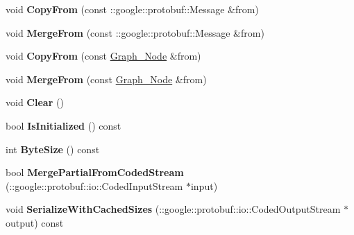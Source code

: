\begin{DoxyCompactItemize}
\item 
\hypertarget{classgraph_1_1Graph__Node_a5f3eca853b1a6ab6d72b95fc63edc476}{
void {\bfseries CopyFrom} (const ::google::protobuf::Message \&from)}
\label{classgraph_1_1Graph__Node_a5f3eca853b1a6ab6d72b95fc63edc476}

\item 
\hypertarget{classgraph_1_1Graph__Node_a4c182ee38bc9ad649a9ae67f9ba5ae18}{
void {\bfseries MergeFrom} (const ::google::protobuf::Message \&from)}
\label{classgraph_1_1Graph__Node_a4c182ee38bc9ad649a9ae67f9ba5ae18}

\item 
\hypertarget{classgraph_1_1Graph__Node_ab2ba680d4220f5c206b77aa8dafd5816}{
void {\bfseries CopyFrom} (const \hyperlink{classgraph_1_1Graph__Node}{Graph\_\-Node} \&from)}
\label{classgraph_1_1Graph__Node_ab2ba680d4220f5c206b77aa8dafd5816}

\item 
\hypertarget{classgraph_1_1Graph__Node_a979ddc18e4e1238cf396311c6622ef43}{
void {\bfseries MergeFrom} (const \hyperlink{classgraph_1_1Graph__Node}{Graph\_\-Node} \&from)}
\label{classgraph_1_1Graph__Node_a979ddc18e4e1238cf396311c6622ef43}

\item 
\hypertarget{classgraph_1_1Graph__Node_a4bddb506c7141091ad3989769a535604}{
void {\bfseries Clear} ()}
\label{classgraph_1_1Graph__Node_a4bddb506c7141091ad3989769a535604}

\item 
\hypertarget{classgraph_1_1Graph__Node_a60da720d929b8e8d5aefd410466c3871}{
bool {\bfseries IsInitialized} () const }
\label{classgraph_1_1Graph__Node_a60da720d929b8e8d5aefd410466c3871}

\item 
\hypertarget{classgraph_1_1Graph__Node_ab25a1fde48166c7639063b5750b9887b}{
int {\bfseries ByteSize} () const }
\label{classgraph_1_1Graph__Node_ab25a1fde48166c7639063b5750b9887b}

\item 
\hypertarget{classgraph_1_1Graph__Node_a3d4ce335c0bc53aa858c0e7a87a257e7}{
bool {\bfseries MergePartialFromCodedStream} (::google::protobuf::io::CodedInputStream $\ast$input)}
\label{classgraph_1_1Graph__Node_a3d4ce335c0bc53aa858c0e7a87a257e7}

\item 
\hypertarget{classgraph_1_1Graph__Node_ac36ab307cedb19991696faea055dc7e1}{
void {\bfseries SerializeWithCachedSizes} (::google::protobuf::io::CodedOutputStream $\ast$output) const }
\label{classgraph_1_1Graph__Node_ac36ab307cedb19991696faea055dc7e1}


\end{DoxyCompactItemize}

